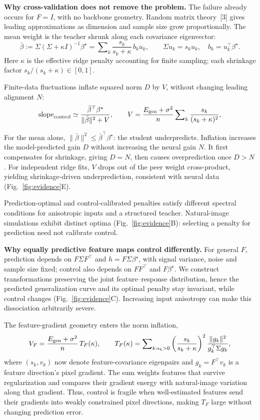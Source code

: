 \documentclass[12pt,a4paper]{article}
\newcommand{\head}[1]{\par\noindent\textbf{#1}\enspace\ignorespaces}
\newcommand{\bt}{\beta^\star}
\newcommand{\mb}{\bar\beta}
\begin{document}
\head{Why cross-validation does not remove the problem.}
The failure already occurs for $F=I$, with no backbone geometry. Random matrix theory~[3] gives leading approximations as dimension and sample size grow proportionally. The mean weight is the teacher shrunk along each covariance eigenvector:
\begin{equation}
\mb:=\Sigma(\Sigma+\kappa I)^{-1}\bt
=\sum\nolimits_k\frac{s_k}{s_k+\kappa}\,b_k u_k,
\qquad \Sigma u_k=s_k u_k,\quad b_k=u_k^\top\bt.
\label{eq:mean-shrinkage}
\end{equation}
Here $\kappa$ is the effective ridge penalty accounting for finite sampling; each shrinkage factor $s_k/(s_k+\kappa)\in[0,1]$.\par
Finite-data fluctuations inflate squared norm $D$ by $V$, without changing leading alignment $N$:
\begin{equation}
\mathrm{slope}_{\rm control}\simeq
\frac{\mb^\top\bt}{\|\mb\|^2+V},
\qquad
V=\frac{E_{\rm gen}+\sigma^2}{n}
\sum\nolimits_k\frac{s_k}{(s_k+\kappa)^2},
\label{eq:inflation}
\end{equation}\par
For the mean alone, $\|\mb\|^2\le\mb^\top\bt$: the student underpredicts. Inflation increases the model-predicted gain $D$ without increasing the neural gain $N$. It first compensates for shrinkage, giving $D=N$, then causes overprediction once $D>N$. For independent ridge fits, $V$ drops out of the peer weight cross-product, yielding shrinkage-driven underprediction, consistent with neural data (Fig.~\ref{fig:evidence}E).\par
Prediction-optimal and control-calibrated penalties satisfy different spectral conditions for anisotropic inputs and a structured teacher. Natural-image simulations exhibit distinct optima (Fig.~\ref{fig:evidence}B): selecting a penalty for prediction need not calibrate control.\par

\head{Why equally predictive feature maps control differently.}
For general $F$, prediction depends on $F\Sigma F^\top$ and $h=F\Sigma\bt$, with signal variance, noise and sample size fixed; control also depends on $FF^\top$ and $F\bt$. We construct transformations preserving the joint feature--response distribution, hence the predicted generalization curve and its optimal penalty stay invariant, while control changes (Fig.~\ref{fig:evidence}C). Increasing input anisotropy can make this dissociation arbitrarily severe.

The feature-gradient geometry enters the norm inflation, 
\begin{equation}
V_F=\frac{E_{\rm gen}+\sigma^2}{n}\,T_F(\kappa),
\qquad
T_F(\kappa)=\sum\nolimits_{k:s_k>0}
\left(\frac{s_k}{s_k+\kappa}\right)^2
\frac{\|g_k\|^2}{g_k^\top\Sigma g_k},
\label{eq:features}
\end{equation}
where $(s_k,v_k)$ now denote feature-covariance eigenpairs and $g_k=F^\top v_k$ is a feature direction's pixel gradient. The sum weights features that survive regularization and compares their gradient energy with natural-image variation along that gradient. Thus, control is fragile when well-estimated features send their gradients into weakly constrained pixel directions, making $T_F$ large without changing prediction error.
\end{document}
